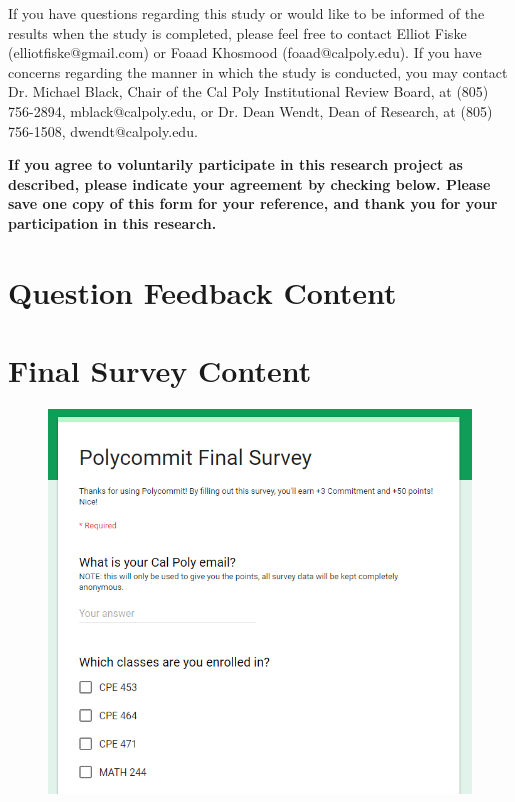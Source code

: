 If you have questions regarding this study or would like to be informed of the results when the study is completed, please feel free to contact Elliot Fiske (elliotfiske@gmail.com) or Foaad Khosmood (foaad@calpoly.edu).  If you have concerns regarding the manner in which the study is conducted, you may contact Dr. Michael Black, Chair of the Cal Poly Institutional Review Board, at (805) 756-2894, mblack@calpoly.edu, or Dr. Dean Wendt, Dean of Research, at (805) 756-1508, dwendt@calpoly.edu.

\textbf{If you agree to voluntarily participate in this research project as described, please indicate your agreement by checking below. Please save one copy of this form for your reference, and thank you for your participation in this research.}

\chapter{Question Feedback Content}
\label{appendix:question_feedback}


\chapter{Final Survey Content}

\begin{figure}[h!]
	\includegraphics[width=1.0\linewidth]{figures/survey1}
	\label{fig:survey1}
\end{figure}

